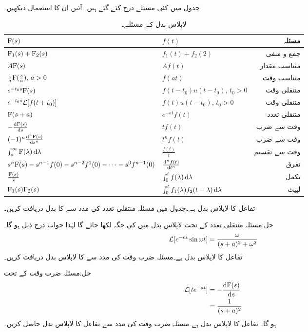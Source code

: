 جدول  میں کئی مسئلے درج کئے گئے ہیں۔ آئیں ان کا استعمال دیکھیں۔
\begin{table}
\caption{لاپلاس بدل کے مسئلے۔}
\label{جدول_لاپلاس_مسئلے}
\centering
\begin{tabular}{l l r}
 ${{\textup{F}}}(s)$&$f(t)$ & مسئلہ\\  [2ex] 
\hline
 ${{\textup{F}}}_1(s)+{{\textup{F}}}_2(s)$&$f_1(t)+f_2(2)$ & جمع و منفی\\[2ex] 
 $A{{\textup{F}}}(s)$&$Af(t)$& متناسب مقدار\\[2ex] 
$\frac{1}{a}{{\textup{F}}}(\frac{s}{a}),\, a>0$ & $ f(at)$ & متناسب وقت\\[2ex] 
 $e^{-t_0 s}{{\textup{F}}}(s)$&$f(t-t_0) u(t-t_0), \, t_0>0$  & منتقلی وقت\\[2ex] 
 $e^{-t_0 s}\mathcal{L} [f(t+t_0)]$&$f(t) u(t-t_0), \, t_0>0$  & منتقلی وقت\\[2ex] 
${{\textup{F}}}(s+a)$& $e^{-at} f(t)$  & منتقلی تعدد\\[2ex] 
$-\frac{\dif \bF(s)}{\dif s}$ & $t f(t)$  & وقت سے ضرب\\[2ex] 
$(-1)^n\frac{\dif{^n} \bF(s)}{\dif s^n}$ & $t^n f(t)$  & وقت سے ضرب\\[2ex] 
$\int_s^{\infty} \bF(\lambda) \dif \lambda $ & $\frac{f(t)}{t}$  & وقت سے تقسیم\\[2ex] 
$s^n {{\textup{F}}}(s)-s^{n-1}f(0)-s^{n-2} f^1(0)-\cdots -s^0 f^{n-1}(0)$ & $\frac{\dif{^n} f(t)}{\dif t^n}$  & تفرق\\[2ex] 
$\frac{{{\textup{F}}}(s)}{s}$ & $\int_0^t f(\lambda) \dif \lambda$  & تکمل\\[2ex] 
${{\textup{F}}}_1(s) {{\textup{F}}}_2(s)$ & $\int_0^t f_1(\lambda) f_2(t-\lambda) \dif \lambda$  & لپیٹ
\end{tabular}
\end{table}
تفاعل  کا لاپلاس بدل  ہے۔جدول  میں مسئلہ منتقلی تعدد کی مدد سے  کا بدل دریافت کریں۔

حل:مسئلہ منتقلی تعدد کے تحت لاپلاس بدل میں  کی جگہ   لکھا جائے گا لہٰذا جواب درج ذیل ہو گا۔
\begin{align*}
\mathcal{L}[e^{-at} \sin \omega t]=\frac{\omega}{(s+a)^2+\omega^2}
\end{align*}
تفاعل  کا لاپلاس بدل  ہے۔مسئلہ ضرب وقت کی مدد سے  کا لاپلاس بدل دریافت کریں۔

حل:مسئلہ ضرب وقت کے  تحت
\begin{align*}
\Laplace[te^{-at}] &=-\frac{\dif \bF(s)}{\dif s}\\
&=\frac{1}{(s+a)^2}
\end{align*}
ہو گا۔
تفاعل  کا لاپلاس بدل  ہے۔مسئلہ ضرب وقت کی مدد سے تفاعل  کا  لاپلاس بدل حاصل کریں۔

